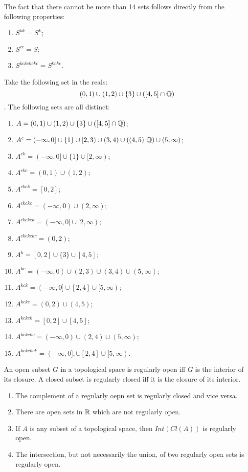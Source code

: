 \begin{solution}
  The fact that there cannot be more than 14 sets follows directly from the following properties:
  \begin{enumerate}
    \item $S^{kk} = S^{k}$;
    \item $S^{cc} = S$;
    \item $S^{kckckckc} = S^{kckc}$.
  \end{enumerate}
  Take the following set in the reals:
  \[(0, 1) \cup (1, 2) \cup \{3\} \cup ([4, 5] \cap \mathbb{Q})\].
  The following sets are all distinct:
  \begin{enumerate}
    \item $A = (0, 1) \cup (1, 2) \cup \{3\} \cup ([4, 5] \cap \mathbb{Q})$;
    \item $A^{c} = (- \infty, 0] \cup \{1\} \cup [2, 3) \cup (3, 4) \cup ((4, 5) \ \mathbb{Q}) \cup (5, \infty)$;
    \item $A^{ck} = (- \infty, 0] \cup \{1\} \cup [2, \infty)$;
    \item $A^{ckc} = (0, 1) \cup (1, 2)$;
    \item $A^{ckck} = [0, 2]$;
    \item $A^{ckckc} = (- \infty, 0) \cup (2, \infty)$;
    \item $A^{ckckck} = (- \infty, 0] \cup [2, \infty)$;
    \item $A^{ckckckc} = (0, 2)$;
    \item $A^{k} = [0, 2] \cup \{3\} \cup [4, 5]$;
    \item $A^{kc} = (- \infty, 0) \cup (2, 3) \cup (3, 4) \cup (5, \infty)$;
    \item $A^{kck} = (- \infty, 0] \cup [2, 4] \cup [5, \infty)$;
    \item $A^{kckc} = (0, 2) \cup (4, 5)$;
    \item $A^{kckck} = [0, 2] \cup [4, 5]$;
    \item $A^{kckckc} = (- \infty, 0) \cup (2, 4) \cup (5, \infty)$;
    \item $A^{kckckck} = (- \infty, 0], \cup [2, 4] \cup [5, \infty)$.
  \end{enumerate}
\end{solution}

\begin{problem}
  An open subset $G$ in a topological space is regularly open iff $G$ is the interior of its closure.
  A closed subset is regularly closed iff it is the closure of its interior.
  \begin{enumerate}
    \item The complement of a regularly oepn set is regularly closed and vice versa.
    \item There are open sets in $\mathbb{R}$ which are not regularly open.
    \item If $A$ is any subset of a topological space, then $Int(Cl(A))$ is regularly open.
    \item The intersection, but not necessarily the union, of two regularly open sets is regularly open.
  \end{enumerate}
\end{problem}

\begin{solution}
\end{solution}
